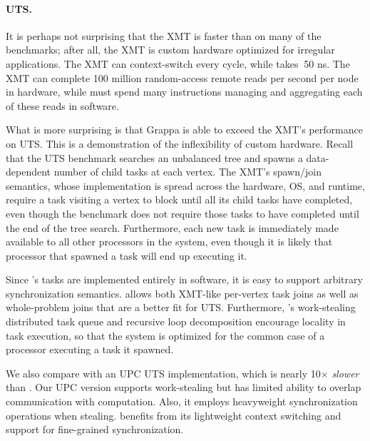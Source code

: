 \paragraph{UTS.}
It is perhaps not surprising that the XMT is faster than
\Grappa on many of the benchmarks; after all, the XMT is custom
hardware optimized for irregular applications. The XMT can
context-switch every cycle, while \Grappa takes $~$50 ns. The XMT can
complete 100 million random-access remote reads per second per node in
hardware, while \Grappa must spend many instructions managing and
aggregating each of these reads in software.

What is more surprising is that Grappa is able to exceed the XMT's
performance on UTS. This is a demonstration of the inflexibility of
custom hardware. Recall that the UTS benchmark searches an unbalanced
tree and spawns a data-dependent number of child tasks at each
vertex. The XMT's spawn/join semantics, whose implementation is spread
across the hardware, OS, and runtime, require a task visiting a vertex
to block until all its child tasks have completed, even though the
benchmark does not require those tasks to have completed until the end
of the tree search. Furthermore, each new task is immediately made
available to all other processors in the system, even though it is
likely that processor that spawned a task will end up executing it.

Since \Grappa's tasks are implemented entirely in software, it is easy
to support arbitrary synchronization semantics. \Grappa allows both
XMT-like per-vertex task joins as well as whole-problem joins that are
a better fit for UTS. Furthermore, \Grappa's work-stealing distributed
task queue and recursive loop decomposition encourage locality in task
execution, so that the system is optimized for the common case of a
processor executing a task it spawned.

We also compare with an UPC UTS implementation, which is nearly 10$\times$
\emph{slower} than \Grappa. Our UPC version supports work-stealing but has
limited ability to overlap communication with computation. Also, it
employs heavyweight synchronization operations when stealing. \Grappa
benefits from its lightweight context switching and support for fine-grained
synchronization.

